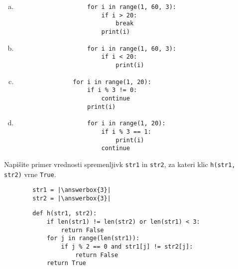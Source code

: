 \documentclass[arhiv, 10pt]{../izpit}
\newcommand{\inlinepy}[1]{\texttt{#1}}
\newcommand{\answerbox}[1]{\framebox{\vphantom{\large M}\hspace{#1cm}}}
\begin{document}
        \begin{multicols}{2}
        \begin{enumerate}[(a)]
\item 
                \begin{verbatim}
                    for i in range(1, 60, 3):
                        if i > 20:
                            break
                        print(i)
                \end{verbatim}
            
\item 
                \begin{verbatim}
                    for i in range(1, 60, 3):
                        if i < 20:
                            print(i)
                \end{verbatim}
            
\item 
            \begin{verbatim}
                for i in range(1, 20):
                    if i % 3 != 0:
                        continue
                    print(i)
            \end{verbatim}
        
\item 
                \begin{verbatim}
                    for i in range(1, 20):
                        if i % 3 == 1:
                            print(i)
                        continue
                \end{verbatim}
            
\end{enumerate}

        \end{multicols}
    
        \naloga*
        \begin{multicols}{2}
        \noindent
        Napišite primer vrednosti spremenljivk \inlinepy{str1} in \inlinepy{str2}, za kateri klic \inlinepy{h(str1, str2)} vrne \inlinepy{True}.
        \begin{verbatim}
        str1 = |\answerbox{3}|
        str2 = |\answerbox{3}|
        \end{verbatim}
        \vfil
        \columnbreak
        \begin{verbatim}
        def h(str1, str2):
            if len(str1) != len(str2) or len(str1) < 3:
                return False
            for j in range(len(str1)):
                if j % 2 == 0 and str1[j] != str2[j]:
                    return False
            return True
        \end{verbatim}
        \end{multicols}
    
\end{document}
